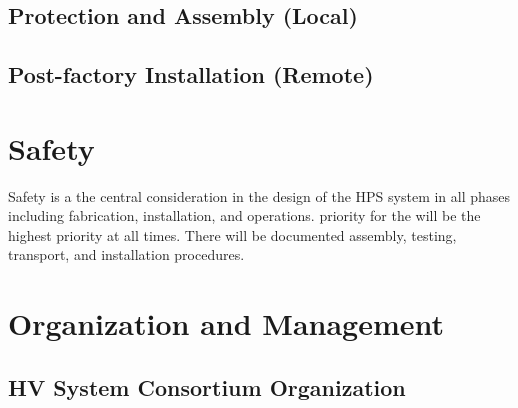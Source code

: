 \subsection{Protection and Assembly (Local)}
\label{sec:fddp-hv-qc-local}


\subsection{Post-factory Installation (Remote)}
\label{sec:fddp-hv-qc-remote}





\section{Safety}

Safety is a the central consideration in the design of the HPS system in all phases including fabrication, installation, and operations. priority for the will be the highest priority at all times. There will be documented assembly, testing, transport, and installation procedures.

\label{sec:fddp-hv-safety}






\section{Organization and Management}
\label{sec:fddp-hv-org}


\subsection{HV System Consortium Organization}
\label{sec:fddp-hv-org-consortium}

